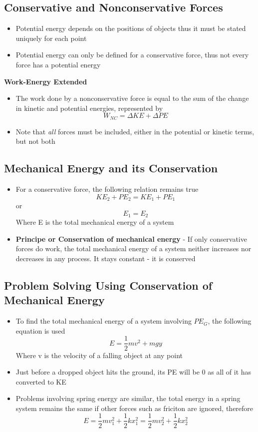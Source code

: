 \subsection{Conservative and Nonconservative Forces}
\begin{itemize}
    \item Potential energy depends on the positions of objects thus it must be stated uniquely for each point
    \item Potential energy can only be defined for a conservative force, thus not every force has a potential energy
\end{itemize}

\textbf{Work-Energy Extended}
\begin{itemize}
    \item The work done by a nonconservative force is equal to the sum of the change in kinetic and potential energies, represented by \[W_{NC}=\Delta KE+\Delta PE\]
    \item Note that \emph{all} forces must be included, either in the potential or kinetic terms, but not both
\end{itemize}

\subsection{Mechanical Energy and its Conservation}
\begin{itemize}
    \item For a conservative force, the following relation remains true \[KE_2+PE_2=KE_1+PE_1\]
    or \[E_1=E_2\]
    Where E is the total mechanical energy of a system
    \item \textbf{Principe or Conservation of mechanical energy} - If only conservative forces do work, the total mechanical energy of a system neither increases nor decreases in any process. It stays constant - it is conserved
\end{itemize}

\subsection{Problem Solving Using Conservation of Mechanical Energy}
\begin{itemize}
    \item To find the total mechanical energy of a system involving \(PE_G\), the following equation is used \[E=\frac{1}{2}mv^2+mgy\] Where v is the velocity of a falling object at any point
    \item Just before a dropped object hits the ground, its PE will be 0 as all of it has converted to KE 
    \item Problems involving spring energy are similar, the total energy in a spring system remains the same if other forces such as friciton are ignored, therefore \[E=\frac{1}{2}mv_1^2+\frac{1}{2}kx_1^2=\frac{1}{2}mv_2^2+\frac{1}{2}kx_2^2\]
\end{itemize}

